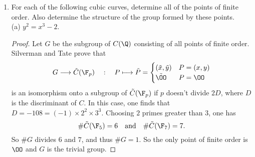 \documentclass[11pt, oneside]{article}
\begin{document}
\begin{enumerate}
\begin{proof}
$$
1 = x^3 + px
$$ 
have solutions in the integers. Setting $y=2$, one finds a solution to
$$
4= x^3+px
$$
when $p=3$, namely $(1,2)$. However, $2(1,2) $ does not have integer coordinates, so $(1,2)$ is not of finite order. This equation has no other solutions in the integers for all primes $p$ since $x^3 + px$ exceeds $4$ for all primes $p>3$ with the condition that $x\in \Z$. Setting $y=p$, one gets the equation
$$
p^2 = x^3 + px.
$$
Suppose $p$ is odd. Reducing mod $2$, one obtains
\begin{align*}
0 &= x + x + 1\\
	&= 1.
\end{align*}
So there are no solutions for odd $p$. Suppose $p=2$. Then 
$$
4 = x^3 + 2x.
$$
This equation has no integer solutions. Lastly, set $y = 2p$. One has
$$
4p^2 = x^3 + px.
$$
It follows that $p$ divides $x$. Since $x>0$, $x \ge  p$. One gets 
$$
x^3 + px \ge  p^3 + p^2.
$$
Therefore, $4p^2 \ge  p^3 + p^2$, so $p \le  3$. Setting $p=2$, one gets
$$
8 = x^3 +  2x,
$$
which has no integer solutions. Setting $p=3$, one gets
$$
36 = x^3 + 3x.
$$
One finds that $x= 3$ is the only integer solution, so $(3,6)$ is a potential point of finite order. However, $2(3,6)$ does not have integer coordinates, so $(3,6)$ is of finite order. Having exhausted all possibilities, one finds that the only rational points of finite order on $C$ are $(0,0)$ and $\OO$.
\end{proof}
\setcounter{enumi}{11}
\item For each of the following cubic curves, determine all of the points of finite order. Also determine the structure of the group formed by these points.\\
(a) $y^2 = x^3 - 2$.
\begin{proof}
Let $G$ be the subgroup of $C(\Q)$ consisting of all points of finite order. Silverman and Tate prove that
$$
G \longrightarrow \tilde C(\F_p) \quad:\quad P \longmapsto \tilde P = \begin{cases} (\tilde x, \tilde y) & P = (x,y)\\ \tilde \OO & P = \OO\end{cases}
$$
is an isomorphism onto a subgroup of $\tilde C(\F_p)$ if $p$ doesn't divide $2D$, where $D$ is the discriminant of $C$. In this case, one finds that $D = -108 = (-1) \times2^2 \times 3^3$. Choosing $2$ primes greater than $3$, one has
$$
\# \tilde C(\F_5) = 6\quad\textrm{and}\quad\# \tilde C(\F_7) = 7.
$$
So $\#G$ divides $6$ and $7$, and thus $\#G = 1$. So the only point of finite order is $\OO$ and $G$ is the trivial group.

\end{proof}
\end{enumerate}
\end{document}
